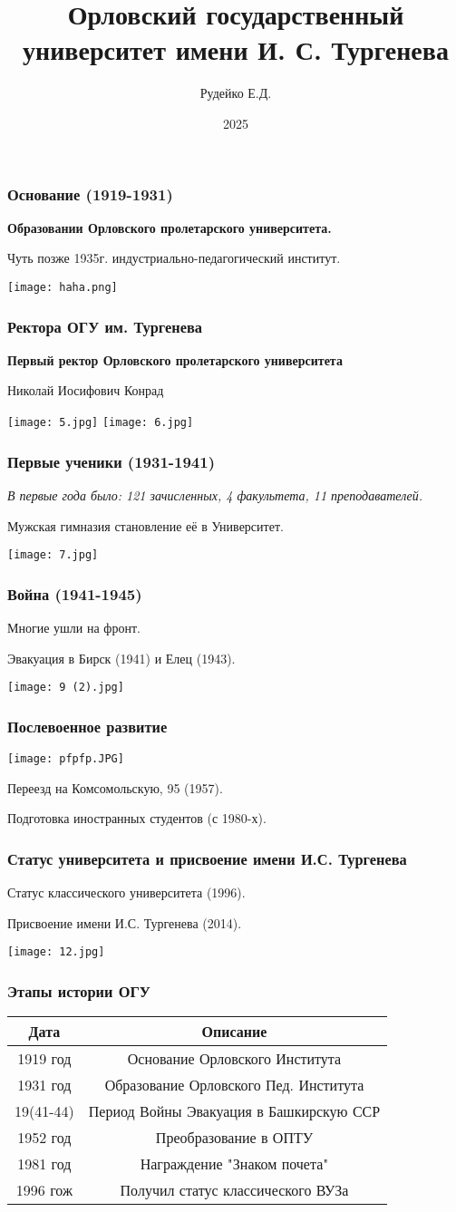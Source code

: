 \documentclass{beamer}
\title{Орловский государственный университет имени И. С. Тургенева}
\author{Рудейко Е.Д.}
\institute{ОГУ им. И.С. Тургенева}
\date{2025}
\begin{document}
\frame{\titlepage}

\begin{frame}
\frametitle{Основание (1919-1931)}
{\centerline{\textbf{Образовании Орловского пролетарского университета.}}}
\centerline{Чуть позже 1935г. индустриально-педагогический институт.}
\texttt{[image: haha.png]}
\end{frame}

\begin{frame}
\frametitle{Ректора ОГУ им. Тургенева}
{\centerline{\textbf{Первый ректор Орловского пролетарского университета }}}
\centerline{Николай Иосифович Конрад}
\texttt{[image: 5.jpg]}
\texttt{[image: 6.jpg]}
\end{frame}

\begin{frame}
\frametitle{Первые ученики (1931-1941)}
\centerline{\textit{В первые года было: 121 зачисленных, 4 факультета, 11 преподавателей.}}
\centerline{Мужская гимназия становление её в Университет.}
\texttt{[image: 7.jpg]}
\end{frame}



\begin{frame}
\frametitle{Война (1941-1945)}
\centerline{Многие ушли на фронт.}
\centerline{Эвакуация в Бирск (1941) и Елец (1943).}
\texttt{[image: 9 (2).jpg]}
\end{frame}

\begin{frame}
\frametitle{Послевоенное развитие}
\texttt{[image: pfpfp.JPG]}
\centerline{Переезд на Комсомольскую, 95 (1957).}
\centerline{Подготовка иностранных студентов (с 1980-х).}
\end{frame}

\begin{frame}
\frametitle{Статус университета и присвоение имени И.С. Тургенева}
\centerline{Статус классического университета (1996).}
\centerline{Присвоение имени И.С. Тургенева (2014).}
\texttt{[image: 12.jpg]}
\end{frame}
\begin{frame}
  \frametitle{Этапы истории ОГУ}
  \begin{table}[h!]
\centering
 \begin{tabular}{||c c||} 
 \hline
 Дата & Описание \\ [0.5ex] 
 \hline\hline
 1919 год & Основание Орловского Института \\ 
 1931 год & Образование Орловского Пед. Института\\
 19(41-44) & Период Войны  Эвакуация в Башкирскую ССР \\
 1952 год & Преобразование в ОПТУ  \\
 1981 год & Награждение "Знаком почета"  \\
 1996 гож & Получил статус классического ВУЗа \\ [1ex] 
 \hline
 \end{tabular}
\end{table}

\end{frame}
\end{document}
